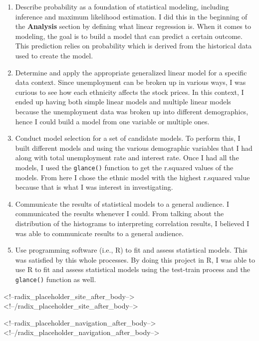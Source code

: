 \documentclass[
]{article}
\begin{document}
\begin{enumerate}
\def\labelenumi{\arabic{enumi}.}
\item
  Describe probability as a foundation of statistical modeling,
  including inference and maximum likelihood estimation. I did this in
  the beginning of the \textbf{Analysis} section by defining what linear
  regression is. When it comes to modeling, the goal is to build a model
  that can predict a certain outcome. This prediction relies on
  probability which is derived from the historical data used to create
  the model.
\item
  Determine and apply the appropriate generalized linear model for a
  specific data context. Since unemployment can be broken up in various
  ways, I was curious to see how each ethnicity affects the stock
  prices. In this context, I ended up having both simple linear models
  and multiple linear models because the unemployment data was broken up
  into different demographics, hence I could build a model from one
  variable or multiple ones.
\item
  Conduct model selection for a set of candidate models. To perform
  this, I built different models and using the various demographic
  variables that I had along with total unemployment rate and interest
  rate. Once I had all the models, I used the \texttt{glance()} function
  to get the r.squared values of the models. From here I chose the
  ethnic model with the highest r.squared value because that is what I
  was interest in investigating.
\item
  Communicate the results of statistical models to a general audience. I
  communicated the results whenever I could. From talking about the
  distribution of the histograms to interpreting correlation results, I
  believed I was able to communicate results to a general audience.
\item
  Use programming software (i.e., R) to fit and assess statistical
  models. This was satisfied by this whole processes. By doing this
  project in R, I was able to use R to fit and assess statistical models
  using the test-train process and the \texttt{glance()} function as
  well.
\end{enumerate}

<!--radix_placeholder_site_after_body-->
<!--/radix_placeholder_site_after_body-->

<!--radix_placeholder_navigation_after_body-->
<!--/radix_placeholder_navigation_after_body-->
\end{document}
